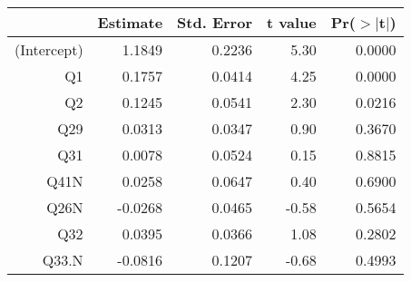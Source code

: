 \begin{table}[ht]
\centering
\begin{tabular}{rrrrr}
  \hline
 & Estimate & Std. Error & t value & Pr($>$$|$t$|$) \\ 
  \hline
(Intercept) & 1.1849 & 0.2236 & 5.30 & 0.0000 \\ 
  Q1 & 0.1757 & 0.0414 & 4.25 & 0.0000 \\ 
  Q2 & 0.1245 & 0.0541 & 2.30 & 0.0216 \\ 
  Q29 & 0.0313 & 0.0347 & 0.90 & 0.3670 \\ 
  Q31 & 0.0078 & 0.0524 & 0.15 & 0.8815 \\ 
  Q41N & 0.0258 & 0.0647 & 0.40 & 0.6900 \\ 
  Q26N & -0.0268 & 0.0465 & -0.58 & 0.5654 \\ 
  Q32 & 0.0395 & 0.0366 & 1.08 & 0.2802 \\ 
  Q33.N & -0.0816 & 0.1207 & -0.68 & 0.4993 \\ 
   \hline
\end{tabular}
\end{table}
